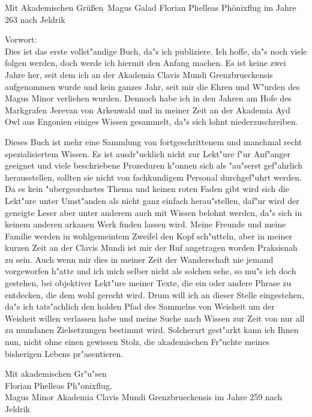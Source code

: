 \documentclass[a5paper,8pt]{book}
\begin{document}
Mit Akademischen Grüßen\
Magus Galad Florian Phelleas Phönixflug im Jahre 263 nach Jeldrik\\

\newpage

Vorwort: \\
Dies ist das erste vollst"andige Buch, da"s ich publiziere. Ich hoffe, da"s noch viele folgen werden, doch werde ich hiermit den Anfang machen. Es ist keine zwei Jahre her, 
seit dem ich an der Akademia Clavis Mundi Grenzbrueckensis aufgenommen wurde und kein ganzes Jahr, seit mir die Ehren und W"urden des Magus Minor verliehen wurden. Dennoch 
habe ich in den Jahren am Hofe des Markgrafen Jerevan von Arkenwald und in meiner Zeit an der Akademia Ayd Owl aus Engonien einiges Wissen gesammelt, da"s sich lohnt 
niederzuschreiben.

Dieses Buch ist mehr eine Sammlung von fortgeschrittenem und manchmal recht spezialisiertem Wissen. Es ist ausdr"ucklich nicht zur Lekt"ure f"ur Anf"anger geeignet und 
viele beschriebene Prozeduren k"onnen sich als "au"serst gef"ahrlich herausstellen, sollten sie nicht von fachkundigem Personal durchgef"uhrt werden.
Da es kein "ubergeordnetes Thema und keinen roten Faden gibt wird sich die Lekt"ure unter Umst"anden als nicht ganz einfach herau"stellen, daf"ur wird der geneigte 
Leser aber unter anderem auch mit Wissen belohnt werden, da"s sich in keinem anderen arkanen Werk finden lassen wird.
Meine Freunde und meine Familie werden in wohlgemeintem Zweifel den Kopf sch"utteln, aber in meiner kurzen Zeit an der Clavis Mundi ist mir der Ruf angetragen 
worden Praksisnah zu sein. Auch wenn mir dies in meiner Zeit der Wanderschaft nie jemand vorgeworfen h"atte und ich mich selber nicht als solchen sehe, so mu"s 
ich doch gestehen, bei objektiver Lekt"ure meiner Texte, die ein oder andere Phrase zu entdecken, die dem wohl gerecht wird. Drum will ich an dieser Stelle 
eingestehen, da"s ich tats"achlich den holden Pfad des Sammelns von Weisheit um der Weisheit willen verlassen habe und meine Suche nach Wissen zur Zeit von 
nur all zu mundanen Zielsetzungen bestimmt wird.
Solcherart gest"arkt kann ich Ihnen nun, nicht ohne einen gewissen Stolz, die akademischen Fr"uchte meines bisherigen Lebens pr"asentieren.

Mit akademischen Gr"u"sen \\

Florian Phelleas Ph"onixflug, \\
Magus Minor Akademia Clavis Mundi Grenzbrueckensis im Jahre 259 nach Jeldrik \\
\end{document}
